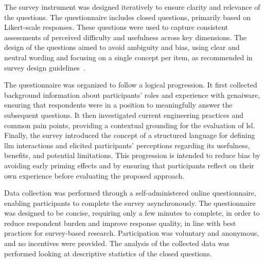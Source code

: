 \documentclass[manuscript,screen]{acmart}
\begin{document}
The survey instrument was designed iteratively to ensure clarity and relevance of the questions. 
The questionnaire includes closed questions, primarily based on Likert-scale responses. 
These questions were used to capture consistent assessments of perceived difficulty and usefulness across key dimensions. 
The design of the questions aimed to avoid ambiguity and bias, using clear and neutral wording and focusing on a single concept per item, as recommended in survey design guidelines~\cite{DBLP:conf/acsos/CalinescuMPW20,DBLP:books/sp/08/KitchenhamP08}.

The questionnaire was organized to follow a logical progression. 
It first collected background information about participants’ roles and experience with \ac{genai}ware, ensuring that respondents were in a position to meaningfully answer the subsequent questions. 
It then investigated current engineering practices and common pain points, providing a contextual grounding for the evaluation of \ac{lsl}. 
Finally, the survey introduced the concept of a structured language for defining \ac{llm} interactions and elicited participants’ perceptions regarding its usefulness, benefits, and potential limitations. 
This progression is intended to reduce bias by avoiding early priming effects and by ensuring that participants reflect on their own experience before evaluating the proposed approach.

Data collection was performed through a self-administered online questionnaire, enabling participants to complete the survey asynchronously. 
The questionnaire was designed to be concise, requiring only a few minutes to complete, in order to reduce respondent burden and improve response quality, in line with best practices for survey-based research. 
Participation was voluntary and anonymous, and no incentives were provided. \cite{DBLP:books/sp/08/KitchenhamP08}
The analysis of the collected data was performed looking at descriptive statistics of the closed questions. 
\end{document}
